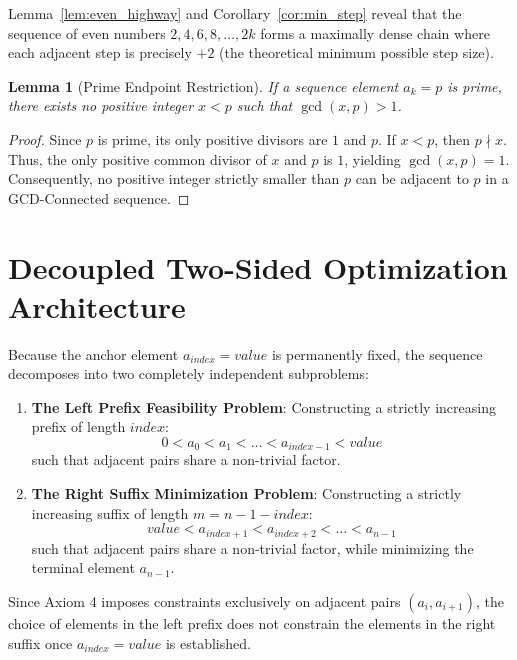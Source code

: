 \documentclass[10pt,journal,compsoc,onecolumn]{IEEEtran}
\newtheorem{lemma}[theorem]{Lemma}
\begin{document}
Lemma~\ref{lem:even_highway} and Corollary~\ref{cor:min_step} reveal that the sequence of even numbers $2, 4, 6, 8, \dots, 2k$ forms a maximally dense chain where each adjacent step is precisely $+2$ (the theoretical minimum possible step size).

\begin{lemma}[Prime Endpoint Restriction]
\label{lem:prime_endpoint}
If a sequence element $a_k = p$ is prime, there exists no positive integer $x < p$ such that $\gcd(x, p) > 1$.
\end{lemma}
\begin{proof}
Since $p$ is prime, its only positive divisors are $1$ and $p$. If $x < p$, then $p \nmid x$. Thus, the only positive common divisor of $x$ and $p$ is $1$, yielding $\gcd(x, p) = 1$. Consequently, no positive integer strictly smaller than $p$ can be adjacent to $p$ in a GCD-Connected sequence.
\end{proof}

\section{Decoupled Two-Sided Optimization Architecture}
\label{sec:architecture}

Because the anchor element $a_{index} = value$ is permanently fixed, the sequence decomposes into two completely independent subproblems:
\begin{enumerate}
    \item \textbf{The Left Prefix Feasibility Problem}: Constructing a strictly increasing prefix of length $index$:
    \begin{equation}
    0 < a_0 < a_1 < \dots < a_{index-1} < value
    \end{equation}
    such that adjacent pairs share a non-trivial factor.
    \item \textbf{The Right Suffix Minimization Problem}: Constructing a strictly increasing suffix of length $m = n - 1 - index$:
    \begin{equation}
    value < a_{index+1} < a_{index+2} < \dots < a_{n-1}
    \end{equation}
    such that adjacent pairs share a non-trivial factor, while minimizing the terminal element $a_{n-1}$.
\end{enumerate}

Since Axiom 4 imposes constraints exclusively on adjacent pairs $(a_i, a_{i+1})$, the choice of elements in the left prefix does not constrain the elements in the right suffix once $a_{index} = value$ is established.
\end{document}
